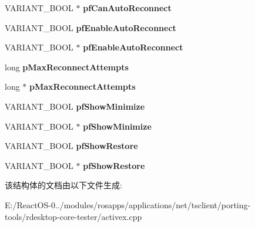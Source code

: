 \begin{DoxyCompactItemize}
V\+A\+R\+I\+A\+N\+T\+\_\+\+B\+O\+OL $\ast$ {\bfseries pf\+Can\+Auto\+Reconnect}
\item 
\mbox{\label{struct_m_s_t_s_c_lib_1_1_i_ms_rdp_client_advanced_settings3_vtbl_aa73e061d29059b2088eb1f1a57cb5777}} 
V\+A\+R\+I\+A\+N\+T\+\_\+\+B\+O\+OL {\bfseries pf\+Enable\+Auto\+Reconnect}
\item 
\mbox{\label{struct_m_s_t_s_c_lib_1_1_i_ms_rdp_client_advanced_settings3_vtbl_a67f420972d239a09253cc813a211180c}} 
V\+A\+R\+I\+A\+N\+T\+\_\+\+B\+O\+OL $\ast$ {\bfseries pf\+Enable\+Auto\+Reconnect}
\item 
\mbox{\label{struct_m_s_t_s_c_lib_1_1_i_ms_rdp_client_advanced_settings3_vtbl_a998600a39792a02b5b50a40c53e4e99e}} 
long {\bfseries p\+Max\+Reconnect\+Attempts}
\item 
\mbox{\label{struct_m_s_t_s_c_lib_1_1_i_ms_rdp_client_advanced_settings3_vtbl_ad2047c1a092246e9ba851366bcb82822}} 
long $\ast$ {\bfseries p\+Max\+Reconnect\+Attempts}
\item 
\mbox{\label{struct_m_s_t_s_c_lib_1_1_i_ms_rdp_client_advanced_settings3_vtbl_a4942d52cb259d6154cfbf07b89e596cc}} 
V\+A\+R\+I\+A\+N\+T\+\_\+\+B\+O\+OL {\bfseries pf\+Show\+Minimize}
\item 
\mbox{\label{struct_m_s_t_s_c_lib_1_1_i_ms_rdp_client_advanced_settings3_vtbl_a7282c12542bca612ce4089b3f1fec21b}} 
V\+A\+R\+I\+A\+N\+T\+\_\+\+B\+O\+OL $\ast$ {\bfseries pf\+Show\+Minimize}
\item 
\mbox{\label{struct_m_s_t_s_c_lib_1_1_i_ms_rdp_client_advanced_settings3_vtbl_afb46723c6d836f23688e40b8ec956c6e}} 
V\+A\+R\+I\+A\+N\+T\+\_\+\+B\+O\+OL {\bfseries pf\+Show\+Restore}
\item 
\mbox{\label{struct_m_s_t_s_c_lib_1_1_i_ms_rdp_client_advanced_settings3_vtbl_a75c5d141a369903d2f4cef5b5ddf83b2}} 
V\+A\+R\+I\+A\+N\+T\+\_\+\+B\+O\+OL $\ast$ {\bfseries pf\+Show\+Restore}
\end{DoxyCompactItemize}


该结构体的文档由以下文件生成\+:\begin{DoxyCompactItemize}
\item 
E\+:/\+React\+O\+S-\/0../modules/rosapps/applications/net/tsclient/porting-\/tools/rdesktop-\/core-\/tester/activex.\+cpp\end{DoxyCompactItemize}
